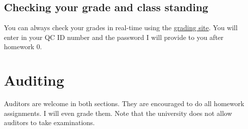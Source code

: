 \documentclass[12pt]{article}
\begin{document}
\subsection*{Checking your grade and class standing}

You can always check your grades in real-time using the \href{http://gradesly.com}{grading site}. You will enter in your QC ID number and the password I will provide to you after homework 0.



\section*{Auditing}

Auditors are welcome in both sections. They are encouraged to do all homework assignments. I will even grade them. Note that the university does not allow auditors to take examinations.
\end{document}
